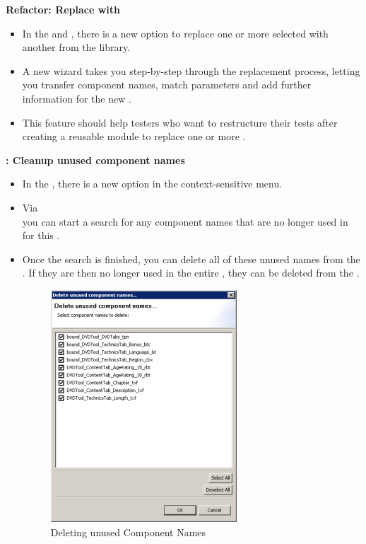 \textbf{Refactor: Replace with \gdcase{}}
\begin{itemize}
\item In the \gdtestcaseeditor{} and \gdtestsuiteeditor{}, there is a new option to replace one or more selected \gdcases{} with another \gdcase{} from the library. 
\item A new wizard takes you step-by-step through the replacement process, letting you transfer component names, match parameters and add further information for the new \gdcase{}.
\item This feature should help testers who want to restructure their tests after creating a reusable module to replace one or more \gdcases{}. 
\end{itemize}

\textbf{\gdomeditor{}: Cleanup unused component names}

\begin{itemize}
\item In the \gdomeditor{}, there is a new option in the context-sensitive menu. 
\item Via  \\
you can start a search for any component names that are no longer used in \gdsuites{} for this \gdaut{}. 
\item Once the search is finished, you can delete all of these unused names from the \gdomeditor{}. If they are then no longer used in the entire \gdproject{}, 
they can be deleted from the \gdcompnamebrowser{}. 

\begin{figure}[h]
\begin{center}
\includegraphics{52/ps/DeleteUnusedCompNames}
\caption{Deleting unused Component Names}
\label{RNDeleteUnusedCN}
\end{center}
\end{figure}
		
\end{itemize}

